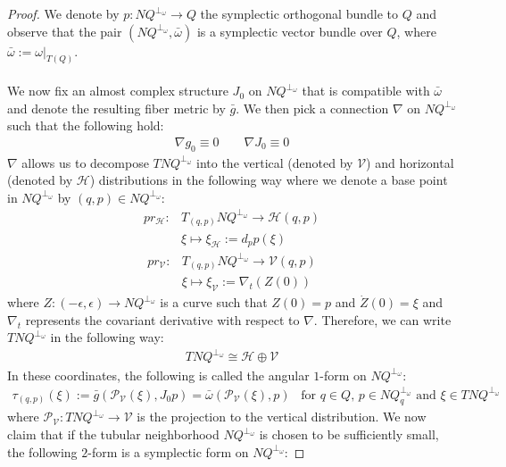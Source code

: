 \documentclass[11pt]{amsart}
\theoremstyle{plain}
\theoremstyle{definition}
\theoremstyle{remark}
\begin{document}
\begin{proof}
We denote by $p: NQ^{\perp_{\omega}} \rightarrow Q$ the symplectic orthogonal bundle to $Q$ and observe that the pair $(NQ^{\perp_{\omega}},\bar\omega)$ is a symplectic vector bundle over $Q$, where $\bar \omega:= \omega|_{T(Q)}$.\\ 
\\
We now fix an almost complex structure $J_0$ on $NQ^{\perp_{\omega}}$ that is compatible with $\bar{\omega}$ and denote the resulting fiber metric by $\bar g$. We then pick a connection $\nabla$ on $NQ^{\perp_{\omega}}$ such that the following hold:
\begin{align}
    \nabla g_0 \equiv 0 \qquad \nabla J_0 \equiv 0
\end{align}
$\nabla$ allows us to decompose $TNQ^{\perp_{\omega}}$ into the vertical (denoted by $\mathcal{V}$) and horizontal (denoted by $\mathcal{H}$) distributions in the following way where we denote a base point in $NQ^{\perp_{\omega}}$ by $(q,p) \in NQ^{\perp_{\omega}}$:
\begin{align}
    pr_{\mathcal{H}}: &T_{(q,p)}NQ^{\perp_{\omega}} \rightarrow \mathcal{\mathcal{H}}(q,p)  \\\nonumber
   &\xi \mapsto \xi_{\mathcal{H}} := d_{p}p(\xi) 
\end{align}
\begin{align}
    pr_{\mathcal{V}}: &T_{(q,p)}NQ^{\perp_{\omega}}\rightarrow \mathcal{V}(q,p) \\\nonumber
   &\xi \mapsto \xi_\mathcal{V} := \nabla_{t}(Z(0)) 
\end{align}
where $Z:(-\epsilon, \epsilon) \rightarrow NQ^{\perp_{\omega}}$ is a curve such that $Z(0) = p$ and $\Dot{Z}(0) = \xi$ and $\nabla_t$ represents the covariant derivative with respect to $\nabla$. Therefore, we can write $TNQ^{\perp_{\omega}}$ in the following way:
\begin{align}\label{V_H_TW}
    TNQ^{\perp_{\omega}} \cong\mathcal{H} \oplus  \mathcal{V} 
\end{align}
In these coordinates, the following is called the angular $1$-form on $NQ^{\perp_{\omega}}$:
\begin{align}\label{angular_tau_def_eqn}
    \tau_{(q,p)}(\xi):= \bar g(\mathcal{P}_{\mathcal{V}}(\xi),J_0p) = \bar\omega(\mathcal{P}_{\mathcal{V}}(\xi),p) \;\;\;\text{for $q\in Q$, $p \in NQ_q^{\perp_{\omega}}$ and $\xi \in TNQ^{\perp_{\omega}}$} 
\end{align}
where $\mathcal{P}_{\mathcal{V}}: TNQ^{\perp_{\omega}} \rightarrow \mathcal{V}$ is the projection to the vertical distribution. We now claim that if the tubular neighborhood $NQ^{\perp_{\omega}}$ is chosen to be sufficiently small, the following $2$-form is a symplectic form on $NQ^{\perp_{\omega}}$:

\end{proof}
\end{document}
